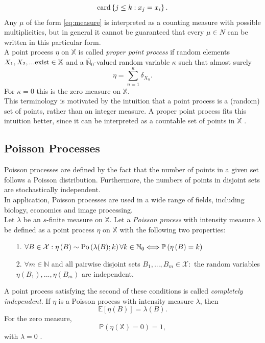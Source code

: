 \begin{equation*}
    \hbox{card}\left\lbrace j\leq k:x_j=x_i\right\rbrace.
\end{equation*}
Any $\mu$ of the form \eqref{eq:measure} is interpreted as a counting measure with possible multiplicities, but in general it cannot be guaranteed that every $\mu\in N$ can be written in this particular form. \\
A point process $\eta$ on $\mathbb{X}$ is called \textit{proper point process} if random elements $X_1,X_2,...\hbox{exist} \in \mathbb{X}$ and a $\overline{\mathbb{N}}_0$-valued random variable $\kappa$ such that almost surely
\begin{equation}
    \eta=\sum_{n=1}^{\kappa}\delta_{X_n}.
\end{equation}
For $\kappa=0$ this is the zero measure on $\mathbb{X}$. \\
This terminology is motivated by the intuition that a point process is a (random) set of points, rather than an integer measure. A proper point process fits this intuition better, since it can be interpreted as a countable set of points in $\mathbb{X}$ \autocite[][9--12]{last2017lectures}.
\subsection{Poisson Processes}
Poisson processes are defined by the fact that the number of points in a given set follows a Poisson distribution. Furthermore, the numbers of points in disjoint sets are stochastically independent. \\
In application, Poisson processes are used in a wide range of fields, including biology, economics and image processing. \\
Let $\lambda$ be an $s$-finite measure on $\mathbb{X}$. Let a \textit{Poisson process} with intensity measure $\lambda$ be defined as a point process $\eta$ on $\mathbb{X}$ with the following two properties:
\begin{itemize}
    \item[1.] $\forall B\in\mathcal{X}: \eta\left(B\right)\sim\hbox{Po}\left(\lambda(B);k\right)\forall k\in\mathbb{N}_0 \Longleftrightarrow \mathbb{P}\left(\eta\left(B\right)=k\right)$
    \item[2.] 
    $\forall m\in\mathbb{N}$ and all pairwise disjoint sets $B_1,...,B_m\in\mathcal{X}:$ the random variables $\eta\left(B_1\right),...,\eta\left(B_m\right)$ are independent.
\end{itemize}
A point process satisfying the second of these conditions is called \textit{completely independent}. If $\eta$ is a Poisson process with intensity measure $\lambda$, then
\begin{equation}
    \mathbb{E}\left[\eta\left(B\right)\right]=\lambda(B).
\end{equation}
For the zero measure,
\begin{equation*}
    \mathbb{P}\left(\eta(\mathbb{X})=0\right)=1,
\end{equation*}
with $\lambda=0$ \autocite[][19]{last2017lectures}.

